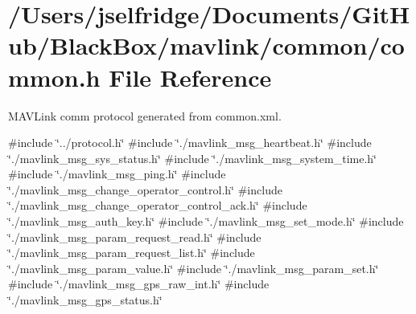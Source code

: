 \section{/\+Users/jselfridge/\+Documents/\+Git\+Hub/\+Black\+Box/mavlink/common/common.h File Reference}
\label{common_8h}


M\+A\+V\+Link comm protocol generated from common.\+xml.  


{\ttfamily \#include \char`\"{}../protocol.\+h\char`\"{}}\newline
{\ttfamily \#include \char`\"{}./mavlink\+\_\+msg\+\_\+heartbeat.\+h\char`\"{}}\newline
{\ttfamily \#include \char`\"{}./mavlink\+\_\+msg\+\_\+sys\+\_\+status.\+h\char`\"{}}\newline
{\ttfamily \#include \char`\"{}./mavlink\+\_\+msg\+\_\+system\+\_\+time.\+h\char`\"{}}\newline
{\ttfamily \#include \char`\"{}./mavlink\+\_\+msg\+\_\+ping.\+h\char`\"{}}\newline
{\ttfamily \#include \char`\"{}./mavlink\+\_\+msg\+\_\+change\+\_\+operator\+\_\+control.\+h\char`\"{}}\newline
{\ttfamily \#include \char`\"{}./mavlink\+\_\+msg\+\_\+change\+\_\+operator\+\_\+control\+\_\+ack.\+h\char`\"{}}\newline
{\ttfamily \#include \char`\"{}./mavlink\+\_\+msg\+\_\+auth\+\_\+key.\+h\char`\"{}}\newline
{\ttfamily \#include \char`\"{}./mavlink\+\_\+msg\+\_\+set\+\_\+mode.\+h\char`\"{}}\newline
{\ttfamily \#include \char`\"{}./mavlink\+\_\+msg\+\_\+param\+\_\+request\+\_\+read.\+h\char`\"{}}\newline
{\ttfamily \#include \char`\"{}./mavlink\+\_\+msg\+\_\+param\+\_\+request\+\_\+list.\+h\char`\"{}}\newline
{\ttfamily \#include \char`\"{}./mavlink\+\_\+msg\+\_\+param\+\_\+value.\+h\char`\"{}}\newline
{\ttfamily \#include \char`\"{}./mavlink\+\_\+msg\+\_\+param\+\_\+set.\+h\char`\"{}}\newline
{\ttfamily \#include \char`\"{}./mavlink\+\_\+msg\+\_\+gps\+\_\+raw\+\_\+int.\+h\char`\"{}}\newline
{\ttfamily \#include \char`\"{}./mavlink\+\_\+msg\+\_\+gps\+\_\+status.\+h\char`\"{}}\newline
